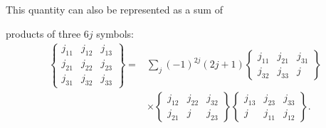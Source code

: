 This quantity can also be represented as a sum of

products of three $6j$ symbols:
\begin{equation}
\begin{aligned}
\left\{\begin{matrix}j_{11}&j_{12}&j_{13}\\j_{21}&j_{22}&j_{23}\\j_{31}&j_{32}&j_{33}\end{matrix}\right\}
={}&\sum_j(-1)^{2j}(2j+1)
\left\{\begin{matrix}j_{11}&j_{21}&j_{31}\\j_{32}&j_{33}&j\end{matrix}\right\}\\
&\times\left\{\begin{matrix}j_{12}&j_{22}&j_{32}\\j_{21}&j&j_{23}\end{matrix}\right\}
\left\{\begin{matrix}j_{13}&j_{23}&j_{33}\\j&j_{11}&j_{12}\end{matrix}\right\}.
\end{aligned}
\tag{108.12}
\end{equation}

